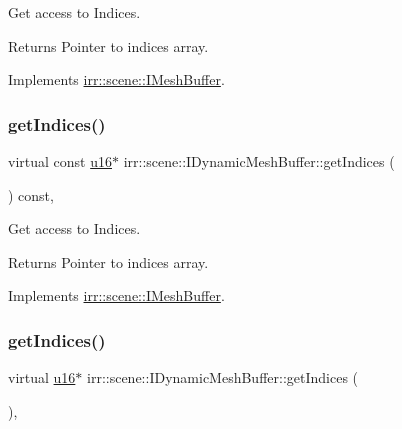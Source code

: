 Get access to Indices. 

\begin{DoxyReturn}{Returns}
Pointer to indices array. 
\end{DoxyReturn}


Implements \hyperlink{classirr_1_1scene_1_1IMeshBuffer_a76c0013378012af7aeb6cb8f4ea8f9a1}{irr\+::scene\+::\+I\+Mesh\+Buffer}.

\mbox{\label{classirr_1_1scene_1_1IDynamicMeshBuffer_ab762d23eb5666125dad83ce20f15b4dd}} 
\subsubsection{\texorpdfstring{get\+Indices()}{getIndices()}\hspace{0.1cm}{\footnotesize\ttfamily [2/4]}}
{\footnotesize\ttfamily virtual const \hyperlink{namespaceirr_ae9f8ec82692ad3b83c21f555bfa70bcc}{u16}$\ast$ irr\+::scene\+::\+I\+Dynamic\+Mesh\+Buffer\+::get\+Indices (\begin{DoxyParamCaption}{ }\end{DoxyParamCaption}) const\hspace{0.3cm}{\ttfamily [inline]}, {\ttfamily [virtual]}}



Get access to Indices. 

\begin{DoxyReturn}{Returns}
Pointer to indices array. 
\end{DoxyReturn}


Implements \hyperlink{classirr_1_1scene_1_1IMeshBuffer_a76c0013378012af7aeb6cb8f4ea8f9a1}{irr\+::scene\+::\+I\+Mesh\+Buffer}.

\mbox{\label{classirr_1_1scene_1_1IDynamicMeshBuffer_a556d8107ac44cbb16892f54370e32812}} 
\subsubsection{\texorpdfstring{get\+Indices()}{getIndices()}\hspace{0.1cm}{\footnotesize\ttfamily [3/4]}}
{\footnotesize\ttfamily virtual \hyperlink{namespaceirr_ae9f8ec82692ad3b83c21f555bfa70bcc}{u16}$\ast$ irr\+::scene\+::\+I\+Dynamic\+Mesh\+Buffer\+::get\+Indices (\begin{DoxyParamCaption}{ }\end{DoxyParamCaption})\hspace{0.3cm}{\ttfamily [inline]}, {\ttfamily [virtual]}}



